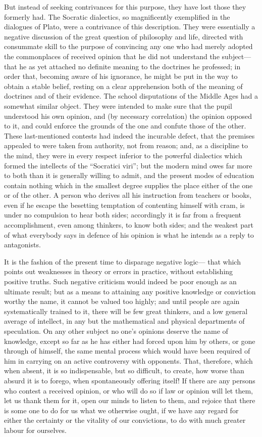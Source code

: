 \documentclass[11pt,openany]{book}
\begin{document}
But instead of seeking contrivances for this purpose, they have lost those they formerly had. The Socratic dialectics, so magnificently exemplified in the dialogues of Plato, were a contrivance of this description. They were essentially a negative discussion of the great question of philosophy and life, directed with consummate skill to the purpose of convincing any one who had merely adopted the commonplaces of received opinion that he did not understand the subject---that he as yet attached no definite meaning to the doctrines he professed; in order that, becoming aware of his ignorance, he might be put in the way to obtain a stable belief, resting on a clear apprehension both of the meaning of doctrines and of their evidence. The school disputations of the Middle Ages had a somewhat similar object. They were intended to make sure that the pupil understood his own opinion, and (by necessary correlation) the opinion opposed to it, and could enforce the grounds of the one and confute those of the other. These last-mentioned contests had indeed the incurable defect, that the premises appealed to were taken from authority, not from reason; and, as a discipline to the mind, they were in every respect inferior to the powerful dialectics which formed the intellects of the ``Socratici viri''; but the modern mind owes far more to both than it is generally willing to admit, and the present modes of education contain nothing which in the smallest degree supplies the place either of the one or of the other. A person who derives all his instruction from teachers or books, even if he escape the besetting temptation of contenting himself with cram, is under no compulsion to hear both sides; accordingly it is far from a frequent accomplishment, even among thinkers, to know both sides; and the weakest part of what everybody says in defence of his opinion is what he intends as a reply to antagonists.

It is the fashion of the present time to disparage negative logic--- that which points out weaknesses in theory or errors in practice, without establishing positive truths. Such negative criticism would indeed be poor enough as an ultimate result; but as a means to attaining any positive knowledge or conviction worthy the name, it cannot be valued too highly; and until people are again systematically trained to it, there will be few great thinkers, and a low general average of intellect, in any but the mathematical and physical departments of speculation. On any other subject no one's opinions deserve the name of knowledge, except so far as he has either had forced upon him by others, or gone through of himself, the same mental process which would have been required of him in carrying on an active controversy with opponents. That, therefore, which when absent, it is so indispensable, but so difficult, to create, how worse than absurd it is to forego, when spontaneously offering itself! If there are any persons who contest a received opinion, or who will do so if law or opinion will let them, let us thank them for it, open our minds to listen to them, and rejoice that there is some one to do for us what we otherwise ought, if we have any regard for either the certainty or the vitality of our convictions, to do with much greater labour for ourselves.
\end{document}
